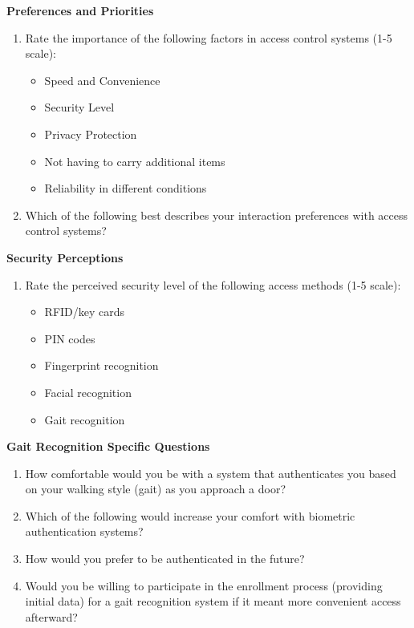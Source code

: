 \begin{appendices}
\begin{center}
\begin{tcolorbox}[breakable, colback=white, colframe=black, width=\textwidth, boxrule=0.5pt]
            \textbf{Preferences and Priorities}
            \begin{enumerate}
                \item Rate the importance of the following factors in access control systems (1-5 scale):
                      \begin{itemize}
                          \item Speed and Convenience
                          \item Security Level
                          \item Privacy Protection
                          \item Not having to carry additional items
                          \item Reliability in different conditions
                      \end{itemize}
                \item Which of the following best describes your interaction preferences with access control systems?
            \end{enumerate}

            \textbf{Security Perceptions}
            \begin{enumerate}
                \item Rate the perceived security level of the following access methods (1-5 scale):
                      \begin{itemize}
                          \item RFID/key cards
                          \item PIN codes
                          \item Fingerprint recognition
                          \item Facial recognition
                          \item Gait recognition
                      \end{itemize}
            \end{enumerate}

            \textbf{Gait Recognition Specific Questions}
            \begin{enumerate}
                \item How comfortable would you be with a system that authenticates you based on your walking style (gait) as you approach a door?
                \item Which of the following would increase your comfort with biometric authentication systems?
                \item How would you prefer to be authenticated in the future?
                \item Would you be willing to participate in the enrollment process (providing initial data) for a gait recognition system if it meant more convenient access afterward?
            \end{enumerate}


\end{tcolorbox}
\end{center}
\end{appendices}
